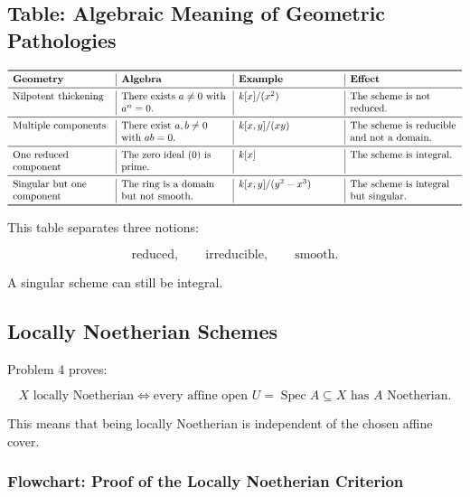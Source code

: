 \documentclass[12pt,a4paper]{article}
\DeclareMathOperator{\Spec}{Spec}
\providecommand{\Spec}{\operatorname{Spec}}
\theoremstyle{notespace}
\begin{document}
\subsection{Table: Algebraic Meaning of Geometric Pathologies}

\[
\begin{array}{>{\raggedright\arraybackslash}p{3.4cm}
		|>{\raggedright\arraybackslash}p{3.7cm}
		|>{\raggedright\arraybackslash}p{3.5cm}
		|>{\raggedright\arraybackslash}p{3.7cm}}
	\toprule
	\textbf{Geometry} & \textbf{Algebra} & \textbf{Example} & \textbf{Effect} \\
	\midrule
	Nilpotent thickening
	&
	There exists \(a\neq 0\) with \(a^n=0\).
	&
	\(k[x]/(x^2)\)
	&
	The scheme is not reduced.
	\\
	\midrule
	Multiple components
	&
	There exist \(a,b\neq 0\) with \(ab=0\).
	&
	\(k[x,y]/(xy)\)
	&
	The scheme is reducible and not a domain.
	\\
	\midrule
	One reduced component
	&
	The zero ideal \((0)\) is prime.
	&
	\(k[x]\)
	&
	The scheme is integral.
	\\
	\midrule
	Singular but one component
	&
	The ring is a domain but not smooth.
	&
	\(k[x,y]/(y^2-x^3)\)
	&
	The scheme is integral but singular.
	\\
	\bottomrule
\end{array}
\]

This table separates three notions:

\[
\text{reduced},
\qquad
\text{irreducible},
\qquad
\text{smooth}.
\]

A singular scheme can still be integral.

\subsection{Locally Noetherian Schemes}

Problem 4 proves:

\[
\boxed{
	X\text{ locally Noetherian}
	\iff
	\text{every affine open }U=\Spec A\subseteq X\text{ has }A\text{ Noetherian}.
}
\]

This means that being locally Noetherian is independent of the chosen affine cover.

\subsubsection*{Flowchart: Proof of the Locally Noetherian Criterion}
\end{document}
